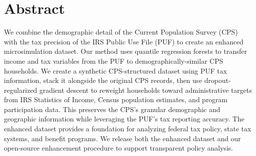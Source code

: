 \section*{Abstract}

We combine the demographic detail of the Current Population Survey (CPS) with the tax precision of the IRS Public Use File (PUF) to create an enhanced microsimulation dataset. Our method uses quantile regression forests to transfer income and tax variables from the PUF to demographically-similar CPS households. We create a synthetic CPS-structured dataset using PUF tax information, stack it alongside the original CPS records, then use dropout-regularized gradient descent to reweight households toward administrative targets from IRS Statistics of Income, Census population estimates, and program participation data. This preserves the CPS's granular demographic and geographic information while leveraging the PUF's tax reporting accuracy. The enhanced dataset provides a foundation for analyzing federal tax policy, state tax systems, and benefit programs. We release both the enhanced dataset and our open-source enhancement procedure to support transparent policy analysis.